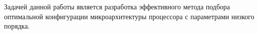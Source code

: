 Задачей данной работы является разработка эффективного метода подбора оптимальной конфигурации микроархитектуры процессора с параметрами низкого порядка.
